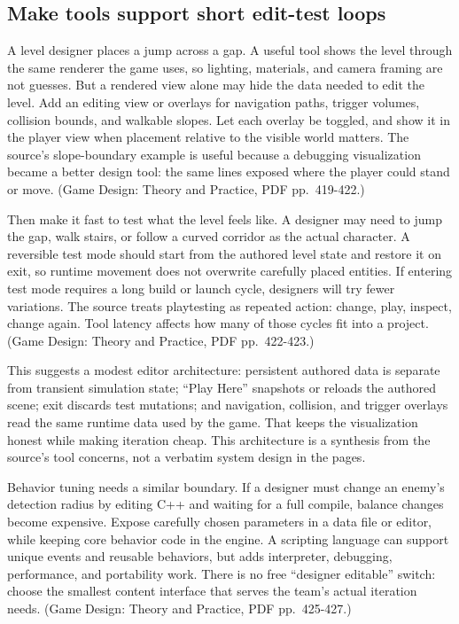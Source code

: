 \subsection{Make tools support short edit-test loops}\label{06-engine-ii-ch032-make-tools-support-short-edit-test-loops}

\hypertarget{06-engine-ii-ch032-make-tools-support-short-edit-test-loops}{}

A level designer places a jump across a gap. A useful tool shows the level through the same renderer the game uses, so lighting, materials, and camera framing are not guesses. But a rendered view alone may hide the data needed to edit the level. Add an editing view or overlays for navigation paths, trigger volumes, collision bounds, and walkable slopes. Let each overlay be toggled, and show it in the player view when placement relative to the visible world matters. The source's slope-boundary example is useful because a debugging visualization became a better design tool: the same lines exposed where the player could stand or move. (Game Design: Theory and Practice, PDF pp.~419-422.)

Then make it fast to test what the level feels like. A designer may need to jump the gap, walk stairs, or follow a curved corridor as the actual character. A reversible test mode should start from the authored level state and restore it on exit, so runtime movement does not overwrite carefully placed entities. If entering test mode requires a long build or launch cycle, designers will try fewer variations. The source treats playtesting as repeated action: change, play, inspect, change again. Tool latency affects how many of those cycles fit into a project. (Game Design: Theory and Practice, PDF pp.~422-423.)

This suggests a modest editor architecture: persistent authored data is separate from transient simulation state; ``Play Here'' snapshots or reloads the authored scene; exit discards test mutations; and navigation, collision, and trigger overlays read the same runtime data used by the game. That keeps the visualization honest while making iteration cheap. This architecture is a synthesis from the source's tool concerns, not a verbatim system design in the pages.

Behavior tuning needs a similar boundary. If a designer must change an enemy's detection radius by editing C++ and waiting for a full compile, balance changes become expensive. Expose carefully chosen parameters in a data file or editor, while keeping core behavior code in the engine. A scripting language can support unique events and reusable behaviors, but adds interpreter, debugging, performance, and portability work. There is no free ``designer editable'' switch: choose the smallest content interface that serves the team's actual iteration needs. (Game Design: Theory and Practice, PDF pp.~425-427.)

